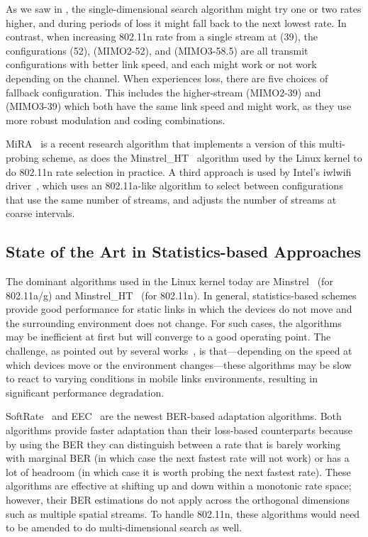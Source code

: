 As we saw in , the single-dimensional search algorithm might try one or two rates higher, and during periods of loss it might fall back to the next lowest rate. In contrast, when increasing 802.11n rate from a single stream at  (39\Mbps), the configurations  (52\Mbps),  (MIMO2-52\Mbps), and  (MIMO3-58.5\Mbps) are all transmit configurations with better link speed, and each might work or not work depending on the channel. When  experiences loss, there are five choices of fallback configuration. This includes the higher-stream  (MIMO2-39\Mbps) and  (MIMO3-39\Mbps) which both have the same link speed and might work, as they use more robust modulation and coding combinations.

MiRA~\cite{Pefkianakis_MiRA} is a recent research algorithm that implements a version of this multi-probing scheme, as does the Minstrel\_HT~\cite{Minstrel_HT} algorithm used by the Linux kernel to do 802.11n rate selection in practice. A third approach is used by Intel's iwlwifi driver~\cite{iwlwifi}, which uses an 802.11a-like algorithm to select between configurations that use the same number of streams, and adjusts the number of streams at coarse intervals.

\subsection{State of the Art in Statistics-based Approaches}
The dominant algorithms used in the Linux kernel today are Minstrel~\cite{Minstrel} (for 802.11a/g) and Minstrel\_HT~\cite{Minstrel_HT} (for 802.11n).  In general, statistics-based schemes provide good performance for static links in which the devices do not move and the surrounding environment does not change. For such cases, the algorithms may be inefficient at first but will converge to a good operating point. The challenge, as pointed out by several works~\cite{Holland_RBAR,Judd_CHARM,Vutukuru_SoftRate}, is that---depending on the speed at which devices move or the environment changes---these algorithms may be slow to react to varying conditions in mobile links environments, resulting in significant performance degradation.

SoftRate~\cite{Vutukuru_SoftRate} and EEC~\cite{Chen_EEC} are the newest BER-based adaptation algorithms. Both algorithms provide faster adaptation than their loss-based counterparts because by using the BER they can distinguish between a rate that is barely working with marginal BER (in which case the next fastest rate will not work) or has a lot of headroom (in which case it is worth probing the next fastest rate). These algorithms are effective at shifting up and down within a monotonic rate space; however, their BER estimations do not apply across the orthogonal dimensions such as multiple spatial streams. To handle 802.11n, these algorithms would need to be amended to do multi-dimensional search as well.


